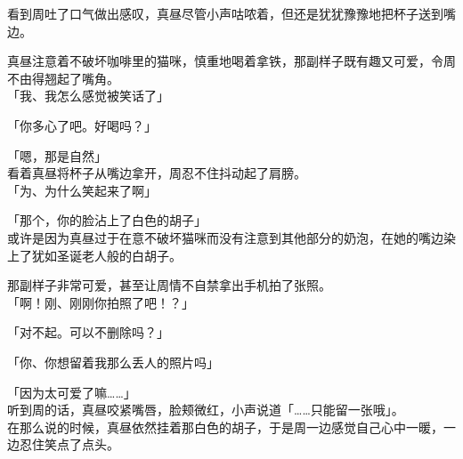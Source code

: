 看到周吐了口气做出感叹，真昼尽管小声咕哝着，但还是犹犹豫豫地把杯子送到嘴边。

真昼注意着不破坏咖啡里的猫咪，慎重地喝着拿铁，那副样子既有趣又可爱，令周不由得翘起了嘴角。\\

「我、我怎么感觉被笑话了」

「你多心了吧。好喝吗？」

「嗯，那是自然」\\

看着真昼将杯子从嘴边拿开，周忍不住抖动起了肩膀。\\

「为、为什么笑起来了啊」

「那个，你的脸沾上了白色的胡子」\\

或许是因为真昼过于在意不破坏猫咪而没有注意到其他部分的奶泡，在她的嘴边染上了犹如圣诞老人般的白胡子。

那副样子非常可爱，甚至让周情不自禁拿出手机拍了张照。\\

「啊！刚、刚刚你拍照了吧！？」

「对不起。可以不删除吗？」

「你、你想留着我那么丢人的照片吗」

「因为太可爱了嘛……」\\

听到周的话，真昼咬紧嘴唇，脸颊微红，小声说道「……只能留一张哦」。\\

在那么说的时候，真昼依然挂着那白色的胡子，于是周一边感觉自己心中一暖，一边忍住笑点了点头。
